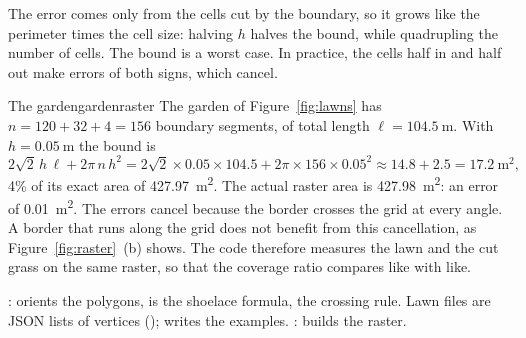 \begin{inwords}
  The error comes only from the cells cut by the boundary, so it grows like
  the perimeter times the cell size: halving $h$ halves the bound, while
  quadrupling the number of cells. The bound is a worst case. In practice,
  the cells half in and half out make errors of both signs, which cancel.
\end{inwords}

\begin{example}{The garden}{gardenraster}
  The garden of Figure~\ref{fig:lawns} has $n = 120 + 32 + 4 = 156$ boundary
  segments, of total length $\ell = \SI{104.5}{\metre}$. With
  $h = \SI{0.05}{\metre}$ the bound is
  \[
    2\sqrt2\,h\,\ell + 2\pi\,n\,h^2
    = 2\sqrt2 \times 0.05 \times 104.5 + 2\pi \times 156 \times 0.05^2
    \approx 14.8 + 2.5 = \SI{17.2}{\metre\squared},
  \]
  4\% of its exact area of \SI{427.97}{\metre\squared}. The actual raster area
  is \SI{427.98}{\metre\squared}: an error of \SI{0.01}{\metre\squared}. The
  errors cancel because the border crosses the grid at every angle. A border
  that runs along the grid does not benefit from this cancellation, as
  Figure~\ref{fig:raster}~(b) shows. The code therefore measures the lawn
  and the cut grass on the same raster, so that the coverage ratio compares
  like with like.
\end{example}

\begin{incode}
  :  orients the
  polygons,  is the shoelace formula, 
  the crossing rule. Lawn files are JSON lists of vertices
  ();  writes the
  examples. :  builds
  the raster.
\end{incode}
